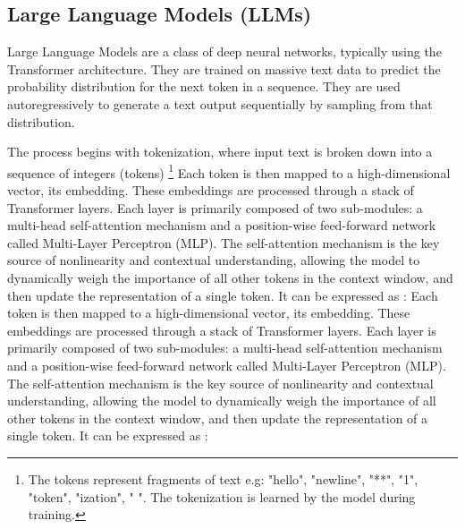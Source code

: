 \documentclass[a4paper,12pt]{article}
\begin{document}
\subsection{Large Language Models (LLMs)}
\label{subsec:llms}
Large Language Models are a class of deep neural networks, typically using the Transformer architecture. They are trained on massive text data to predict the probability distribution for the next token in a sequence. They are used autoregressively to generate a text output sequentially by sampling from that distribution.

The process begins with tokenization, where input text is broken down into a sequence of integers (tokens) \footnote{The tokens represent fragments of text e.g: "hello", "newline", "**", "1", "token", "ization", " ". The tokenization is learned by the model during training.} Each token is then mapped to a high-dimensional vector, its embedding. These embeddings are processed through a stack of Transformer layers. Each layer is primarily composed of two sub-modules: a multi-head self-attention mechanism and a position-wise feed-forward network called Multi-Layer Perceptron (MLP). The self-attention mechanism is the key source of nonlinearity and contextual understanding, allowing the model to dynamically weigh the importance of all other tokens in the context window, and then update the representation of a single token. It can be expressed as \cite{attention}:
Each token is then mapped to a high-dimensional vector, its embedding. These embeddings are processed through a stack of Transformer layers. Each layer is primarily composed of two sub-modules: a multi-head self-attention mechanism and a position-wise feed-forward network called Multi-Layer Perceptron (MLP). The self-attention mechanism is the key source of nonlinearity and contextual understanding, allowing the model to dynamically weigh the importance of all other tokens in the context window, and then update the representation of a single token. It can be expressed as \cite{attention}:
\end{document}
